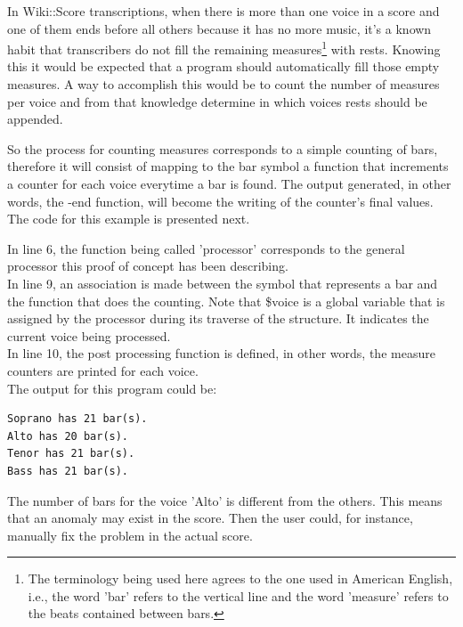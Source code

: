 \documentclass[main.tex]{subfiles}
\begin{document}
In Wiki::Score transcriptions, when there is more than one voice in a score and one of them ends
before all others because it has no more music, it's a known habit that transcribers do not fill the
remaining measures\footnote{The terminology being used here agrees to the one used in American
  English, i.e., the word 'bar' refers to the vertical line and the word 'measure' refers to the beats
contained between bars.} with rests. Knowing this it would be expected that a program should
automatically fill those empty measures. A way to accomplish this would be to count the number of
measures per voice and from that knowledge determine in which voices rests should be appended.

So the process for counting measures corresponds to a simple counting of bars, therefore it
will consist of mapping to the bar symbol a function that increments a counter for each voice
everytime a bar is found. The output generated, in other words, the -end function, will become the
writing of the counter's final values.\\

The code for this example is presented next.




In line 6, the function being called 'processor' corresponds to the general processor this proof of
concept has been describing.\\
In line 9, an association is made between the symbol that represents a bar and the function that
does the counting. Note that \$voice is a global variable that is assigned by the processor during
its traverse of the structure. It indicates the current voice being processed.\\
In line 10, the post processing function is defined, in other words, the measure counters are
printed for each voice.\\

The output for this program could be:
\lstset{numbers=none}
\begin{lstlisting}
Soprano has 21 bar(s).
Alto has 20 bar(s).
Tenor has 21 bar(s).
Bass has 21 bar(s).
\end{lstlisting}

The number of bars for the voice 'Alto' is different from the others. This means that an anomaly may
exist in the score. Then the user could, for instance, manually fix the problem in the actual score.
\end{document}
